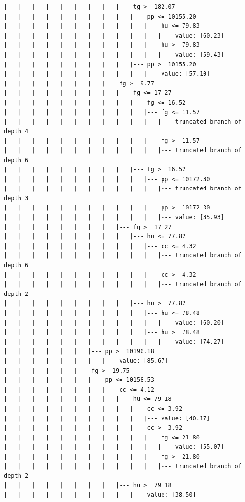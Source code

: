 \documentclass[UTF8, a4paper]{ctexart}
\begin{document}
\begin{lstlisting}
|   |   |   |   |   |   |   |   |--- tg >  182.07
|   |   |   |   |   |   |   |   |   |--- pp <= 10155.20
|   |   |   |   |   |   |   |   |   |   |--- hu <= 79.83
|   |   |   |   |   |   |   |   |   |   |   |--- value: [60.23]
|   |   |   |   |   |   |   |   |   |   |--- hu >  79.83
|   |   |   |   |   |   |   |   |   |   |   |--- value: [59.43]
|   |   |   |   |   |   |   |   |   |--- pp >  10155.20
|   |   |   |   |   |   |   |   |   |   |--- value: [57.10]
|   |   |   |   |   |   |   |--- fg >  9.77
|   |   |   |   |   |   |   |   |--- fg <= 17.27
|   |   |   |   |   |   |   |   |   |--- fg <= 16.52
|   |   |   |   |   |   |   |   |   |   |--- fg <= 11.57
|   |   |   |   |   |   |   |   |   |   |   |--- truncated branch of depth 4
|   |   |   |   |   |   |   |   |   |   |--- fg >  11.57
|   |   |   |   |   |   |   |   |   |   |   |--- truncated branch of depth 6
|   |   |   |   |   |   |   |   |   |--- fg >  16.52
|   |   |   |   |   |   |   |   |   |   |--- pp <= 10172.30
|   |   |   |   |   |   |   |   |   |   |   |--- truncated branch of depth 3
|   |   |   |   |   |   |   |   |   |   |--- pp >  10172.30
|   |   |   |   |   |   |   |   |   |   |   |--- value: [35.93]
|   |   |   |   |   |   |   |   |--- fg >  17.27
|   |   |   |   |   |   |   |   |   |--- hu <= 77.82
|   |   |   |   |   |   |   |   |   |   |--- cc <= 4.32
|   |   |   |   |   |   |   |   |   |   |   |--- truncated branch of depth 6
|   |   |   |   |   |   |   |   |   |   |--- cc >  4.32
|   |   |   |   |   |   |   |   |   |   |   |--- truncated branch of depth 2
|   |   |   |   |   |   |   |   |   |--- hu >  77.82
|   |   |   |   |   |   |   |   |   |   |--- hu <= 78.48
|   |   |   |   |   |   |   |   |   |   |   |--- value: [60.20]
|   |   |   |   |   |   |   |   |   |   |--- hu >  78.48
|   |   |   |   |   |   |   |   |   |   |   |--- value: [74.27]
|   |   |   |   |   |   |--- pp >  10190.18
|   |   |   |   |   |   |   |--- value: [85.67]
|   |   |   |   |   |--- fg >  19.75
|   |   |   |   |   |   |--- pp <= 10158.53
|   |   |   |   |   |   |   |--- cc <= 4.12
|   |   |   |   |   |   |   |   |--- hu <= 79.18
|   |   |   |   |   |   |   |   |   |--- cc <= 3.92
|   |   |   |   |   |   |   |   |   |   |--- value: [40.17]
|   |   |   |   |   |   |   |   |   |--- cc >  3.92
|   |   |   |   |   |   |   |   |   |   |--- fg <= 21.80
|   |   |   |   |   |   |   |   |   |   |   |--- value: [55.07]
|   |   |   |   |   |   |   |   |   |   |--- fg >  21.80
|   |   |   |   |   |   |   |   |   |   |   |--- truncated branch of depth 2
|   |   |   |   |   |   |   |   |--- hu >  79.18
|   |   |   |   |   |   |   |   |   |--- value: [38.50]

\end{lstlisting}
\end{document}
